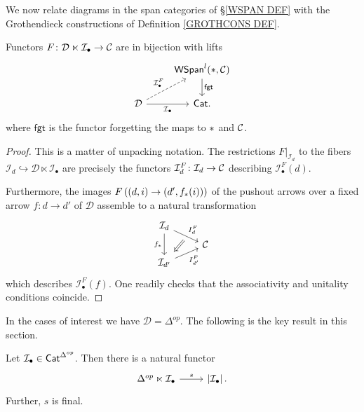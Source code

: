 \documentclass[a4paper,10pt]{article}%
\begin{document}


We now relate diagrams in 
the span categories of \S \ref{WSPAN DEF} with 
the Grothendieck constructions 
of Definition \ref{GROTHCONS DEF}.

\begin{lemma}\label{SIMPSPANREIN LEMMA}
Functors $F \colon \mathcal{D} \ltimes \mathcal{I}_{\bullet} \to \mathcal{C}$ are in bijection with lifts
\[
\begin{tikzcd}
    & \mathsf{WSpan}^l(\**,\C) \ar{d}{\mathsf{fgt}} \\
\mathcal{D} \ar{r}[swap]{\mathcal{I}_{\bullet}} \ar[dashed]{ru}{\mathcal{I}_{\bullet}^F} & \mathsf{Cat}.
\end{tikzcd}
\]
where $\mathsf{fgt}$ is the functor forgetting the maps to $\**$ and $\mathcal{C}$.
\end{lemma}


\begin{proof}
	This is a matter of unpacking notation. The restrictions 
	$F|_{\mathcal{I}_d}$ to the fibers 
	$\mathcal{I}_d \hookrightarrow \mathcal{D} \ltimes \mathcal{I}_{\bullet}$
	are precisely the functors 
	$\mathcal{I}^F_d \colon \mathcal{I}_d \to \mathcal{C}$ describing $\mathcal{I}_{\bullet}^F(d)$.
	
	Furthermore, the images
	$F \left( (d,i) \to (d',f_{\**}(i)) \right)$	
	of the pushout arrows over a fixed arrow $f \colon d \to d'$ of $\mathcal{D}$
assemble to a natural transformation 
\[
	\begin{tikzcd}[row sep=0.4em]
		\mathcal{I}_d 
		\ar{dr}[name=F1]{I_d^F} \ar{dd}[swap]{f_{\**}} &
	\\
 & \C 
	\\
|[alias=G2]| \mathcal{I}_{d'}  \ar{ur}[swap]{I_{d'}^F} & 
		\arrow[Rightarrow, from=F1, to=G2,shorten >=0.15cm,shorten <=0.20cm]
	\end{tikzcd}
\]
which describes $\mathcal{I}_{\bullet}^F(f)$. 
One readily checks that the associativity and unitality conditions coincide.
\end{proof}


In the cases of interest we have $\mathcal{D}=\Delta^{op}$.
The following is the key result in this section.

\begin{proposition}\label{SOURCEFINAL PROP}
	Let $\mathcal{I}_{\bullet} \in \mathsf{Cat}^{\Delta^{op}}$.
	Then there is a natural functor
\[
\begin{tikzcd}
	\Delta^{op} \ltimes \mcI_{\bullet}
	\ar{r}{s} &
	\left| \mcI_{\bullet} \right|.
\end{tikzcd}
\]
Further, $s$ is final.
\end{proposition}
\end{document}
